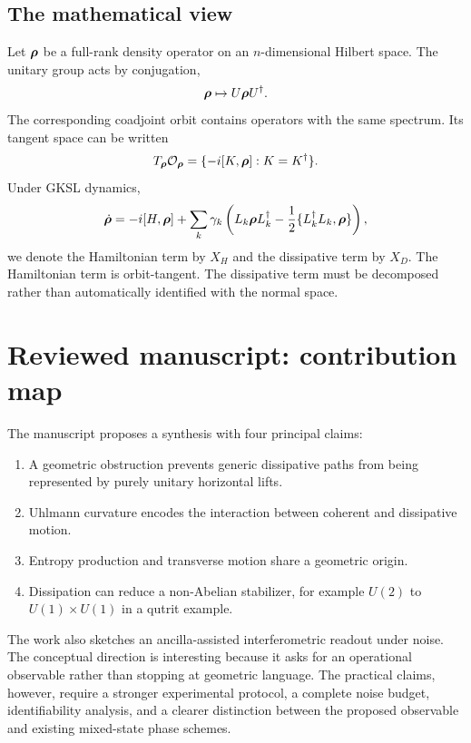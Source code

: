 \subsection{The mathematical view}

Let $\bm{\rho}$ be a full-rank density operator on an $n$-dimensional Hilbert space. The unitary group acts by conjugation,
\[
\bm{\rho} \mapsto U\bm{\rho} U^\dagger.
\]
The corresponding coadjoint orbit contains operators with the same spectrum. Its tangent space can be written
\[
T_{\bm{\rho}}\mathcal{O}_{\bm{\rho}}=\{-i[K,\bm{\rho}] : K=K^\dagger\}.
\]
Under GKSL dynamics,
\begin{equation}
\dot{\bm{\rho}}=-i[H,\bm{\rho}]+\sum_k\gamma_k\left(L_k\bm{\rho} L_k^\dagger-\frac12\{L_k^\dagger L_k,\bm{\rho}\}\right),
\label{eq:gksl}
\end{equation}
we denote the Hamiltonian term by $X_H$ and the dissipative term by $X_D$. The Hamiltonian term is orbit-tangent. The dissipative term must be decomposed rather than automatically identified with the normal space.

\section{Reviewed manuscript: contribution map}

The manuscript \citep{elmorsalani2026} proposes a synthesis with four principal claims:

\begin{enumerate}[label=\textbf{C\arabic*.}]
  \item A geometric obstruction prevents generic dissipative paths from being represented by purely unitary horizontal lifts.
  \item Uhlmann curvature encodes the interaction between coherent and dissipative motion.
  \item Entropy production and transverse motion share a geometric origin.
  \item Dissipation can reduce a non-Abelian stabilizer, for example $U(2)$ to $U(1)\times U(1)$ in a qutrit example.
\end{enumerate}

The work also sketches an ancilla-assisted interferometric readout under noise. The conceptual direction is interesting because it asks for an operational observable rather than stopping at geometric language. The practical claims, however, require a stronger experimental protocol, a complete noise budget, identifiability analysis, and a clearer distinction between the proposed observable and existing mixed-state phase schemes.

